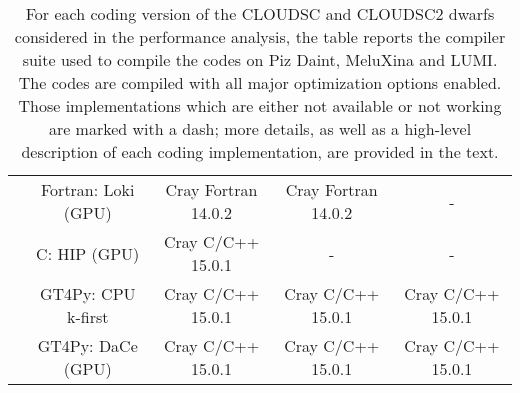 \documentclass[main.tex]{subfiles}
\begin{document}
\begin{table}[t!]
\begin{footnotesize}
\begin{tabular}{|c|c|c|c|c|}
                     & Fortran: Loki (GPU) & Cray Fortran 14.0.2 & Cray Fortran 14.0.2 & - \\
                     & C: HIP (GPU) & Cray C/C++ 15.0.1 & - & - \\
                     & GT4Py: CPU k-first & Cray C/C++ 15.0.1 & Cray C/C++ 15.0.1 & Cray C/C++ 15.0.1 \\
                     & GT4Py: DaCe (GPU) & Cray C/C++ 15.0.1 & Cray C/C++ 15.0.1 & Cray C/C++ 15.0.1 \\
                     \hline
                \end{tabular}
            \end{footnotesize}
            \vspace*{0.2cm}
            \caption{For each coding version of the CLOUDSC and CLOUDSC2 dwarfs considered in the performance analysis, the table reports the compiler suite used to compile the codes on Piz Daint, MeluXina and LUMI. The codes are compiled with all major optimization options enabled. Those implementations which are either not available or not working are marked with a dash; more details, as well as a high-level description of each coding implementation, are provided in the text.}
            \label{tab:compiler}
        \end{table}
\end{document}
